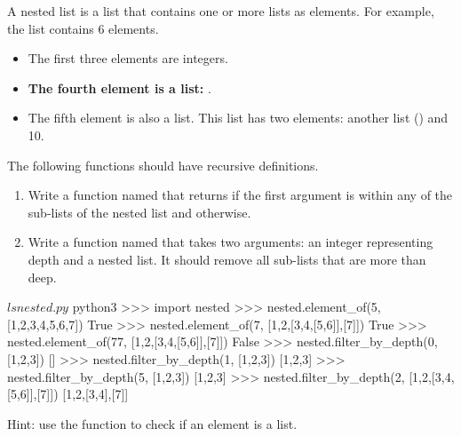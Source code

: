 \documentclass[11pt]{cselabheader}
\begin{document}
\begin{ex}[nested.py]
A nested list is a list that contains one or more lists as elements.
For example, the list 
contains 6 elements. 
\begin{itemize}
\item The first three elements are integers.
\item \textbf{The fourth element is a list:} \pythoninline{[50,60,70]}.
\item The fifth element is also a list. This list has two elements: another list (\pythoninline{[[8888],999]}) and 10.
\end{itemize}

The following functions should have recursive definitions.

\begin{enumerate}
\item
Write a function named  that returns
 if the first argument is within any of the
sub-lists of the nested list and  otherwise.
\item
Write a function named  that takes
two arguments: an integer representing depth and a nested list.
It should remove all sub-lists that are more than 
deep.
\end{enumerate}

\begin{bashcode}
$ ls
nested.py
$ python3
>>> import nested
>>> nested.element_of(5, [1,2,3,4,5,6,7])
True
>>> nested.element_of(7, [1,2,[3,4,[5,6]],[7]])
True
>>> nested.element_of(77, [1,2,[3,4,[5,6]],[7]])
False
>>> nested.filter_by_depth(0, [1,2,3])
[]
>>> nested.filter_by_depth(1, [1,2,3])
[1,2,3]
>>> nested.filter_by_depth(5, [1,2,3])
[1,2,3]
>>> nested.filter_by_depth(2, [1,2,[3,4,[5,6]],[7]])
[1,2,[3,4],[7]]
\end{bashcode}

Hint: use the  function to check if an element is a list.
\end{ex}

\printindex


\end{document}
